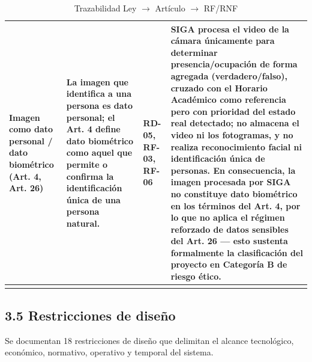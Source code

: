 \begin{longtable}{|p{3.9cm}|p{3.9cm}|p{3.9cm}|p{3.9cm}|}
Imagen como dato personal / dato biométrico (Art. 4, Art. 26) & La imagen que identifica a una persona es dato personal; el Art. 4 define dato biométrico como aquel que permite o confirma la identificación única de una persona natural. & RD-05, RF-03, RF-06 & SIGA procesa el video de la cámara únicamente para determinar presencia/ocupación de forma agregada (verdadero/falso), cruzado con el Horario Académico como referencia pero con prioridad del estado real detectado; no almacena el video ni los fotogramas, y no realiza reconocimiento facial ni identificación única de personas. En consecuencia, la imagen procesada por SIGA \textbf{no constituye dato biométrico} en los términos del Art. 4, por lo que no aplica el régimen reforzado de datos sensibles del Art. 26 --- esto sustenta formalmente la clasificación del proyecto en Categoría B de riesgo ético. \\ \hline
\caption{Trazabilidad Ley $\rightarrow$ Artículo $\rightarrow$ RF/RNF}
\end{longtable}
\endgroup

\subsection*{3.5 Restricciones de diseño}


Se documentan 18 restricciones de diseño que delimitan el alcance tecnológico, económico, normativo, operativo y temporal del sistema.


